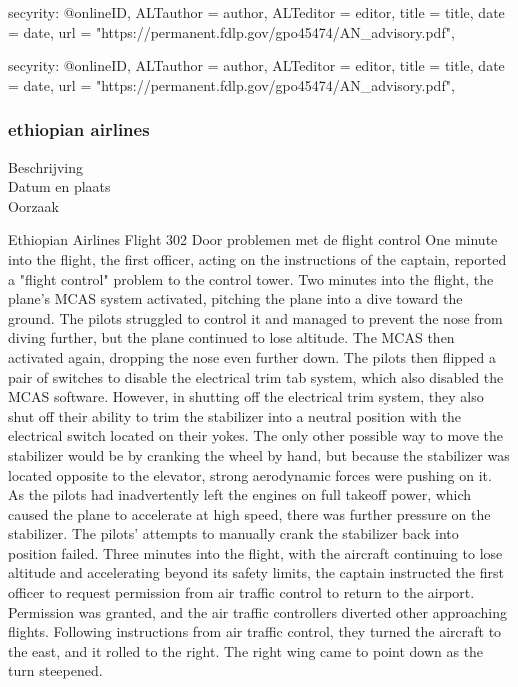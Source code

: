 {{{{{{{{{{{{{{secyrity:
@online{ID,	ALTauthor = {author},	ALTeditor = {editor},	title = {title},	date = {date},	url = {"https://permanent.fdlp.gov/gpo45474/AN_advisory.pdf"},}


secyrity:
@online{ID,	ALTauthor = {author},	ALTeditor = {editor},	title = {title},	date = {date},	url = {"https://permanent.fdlp.gov/gpo45474/AN_advisory.pdf"},}



\subsubsection{ethiopian airlines}

	\begin{description}
	\item[Beschrijving]
	\item[Datum en plaats] 
	\item[Oorzaak]
\end{description}
Ethiopian Airlines Flight 302
Door problemen met de flight control
One minute into the flight, the first officer, acting on the instructions of the captain, reported a "flight control" problem to the control tower.
Two minutes into the flight, the plane's MCAS system activated, pitching the plane into a dive toward the ground. The pilots struggled to control it and managed to prevent the nose from diving further, but the plane continued to lose altitude.
The MCAS then activated again, dropping the nose even further down. The pilots then flipped a pair of switches to disable the electrical trim tab system, which also disabled the MCAS software. However, in shutting off the electrical trim system, they also shut off their ability to trim the stabilizer into a neutral position with the electrical switch located on their yokes. The only other possible way to move the stabilizer would be by cranking the wheel by hand, but because the stabilizer was located opposite to the elevator, strong aerodynamic forces were pushing on it.
As the pilots had inadvertently left the engines on full takeoff power, which caused the plane to accelerate at high speed, there was further pressure on the stabilizer. The pilots' attempts to manually crank the stabilizer back into position failed.
Three minutes into the flight, with the aircraft continuing to lose altitude and accelerating beyond its safety limits, the captain instructed the first officer to request permission from air traffic control to return to the airport. Permission was granted, and the air traffic controllers diverted other approaching flights. Following instructions from air traffic control, they turned the aircraft to the east, and it rolled to the right. The right wing came to point down as the turn steepened.
}}}}}}}}}}}}}}
